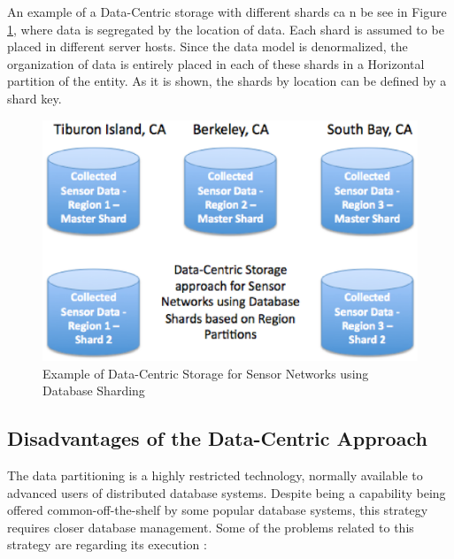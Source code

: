An example of a Data-Centric storage with different shards
\cite{db-shard-intro} ca n be see in Figure
\ref{fig:database-sharding-by-region}, where data is segregated by the
location of data. Each shard is assumed to be placed in different server
hosts. Since the data model is denormalized, the organization of data is
entirely placed in each of these shards in a Horizontal partition of the
entity. As it is shown, the shards by location can be defined by a shard key.

\begin{figure}
  \centering
  \includegraphics[scale=0.5]{../diagrams/database-sharding-by-region}
  \caption{Example of Data-Centric Storage for Sensor Networks using Database
  Sharding}
  \label{fig:database-sharding-by-region}
\end{figure}

\subsection{Disadvantages of the Data-Centric Approach}

The data partitioning is a highly restricted technology, normally available to
advanced users of distributed database systems. Despite being a capability
being offered common-off-the-shelf by some popular database systems, this
strategy requires closer database management. Some of the problems related to
this strategy are regarding its execution \cite{db-shard-discussion}:


